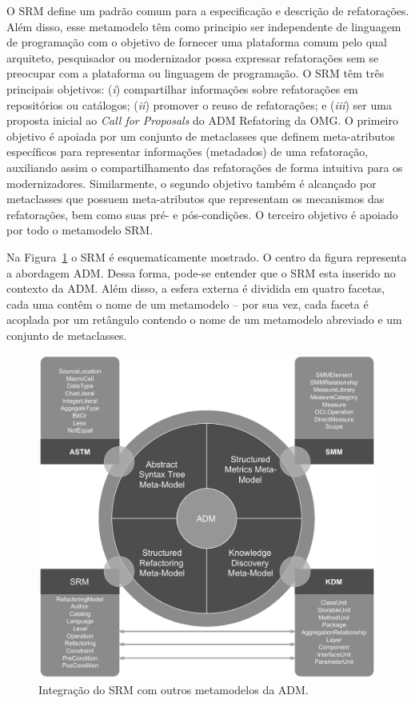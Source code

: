 O SRM define um padrão comum para a especificação e descrição de refatorações. Além disso, esse metamodelo têm como principio ser independente de linguagem de programação com o objetivo de fornecer uma plataforma comum pelo qual arquiteto, pesquisador ou modernizador possa expressar refatorações sem se preocupar com a plataforma ou linguagem de programação. O SRM têm três principais objetivos: (\textit{i}) compartilhar informações sobre refatorações em repositórios ou catálogos; (\textit{ii}) promover o reuso de refatorações; e (\textit{iii}) ser uma proposta inicial ao \textit{Call for Proposals} do ADM Refatoring da OMG. O primeiro objetivo é apoiada por um conjunto de metaclasses que definem meta-atributos específicos para representar informações (metadados) de uma refatoração, auxiliando assim o compartilhamento das refatorações de forma intuitiva para os modernizadores. Similarmente, o segundo objetivo também é alcançado por metaclasses que possuem meta-atributos que representam os mecanismos das refatorações, bem como suas pré- e pós-condições. O terceiro objetivo é apoiado por todo o metamodelo SRM.
 
Na Figura~\ref{fig:refactoring_metamodel} o SRM é esquematicamente mostrado. O centro da figura representa a abordagem ADM. Dessa forma, pode-se entender que o SRM esta inserido no contexto da ADM. Além disso, a esfera externa é dividida em quatro facetas, cada uma contêm o nome de um metamodelo – por sua vez, cada faceta é acoplada por um retângulo contendo o nome de um metamodelo abreviado e um conjunto de metaclasses. 

\begin{figure}[h]
	\centering
	\caption{Integração do SRM com outros metamodelos da ADM.}
	\label{fig:refactoring_metamodel}
	\includegraphics[scale=0.65]{images/SRM2Formatted}
	\fautor
\end{figure}

